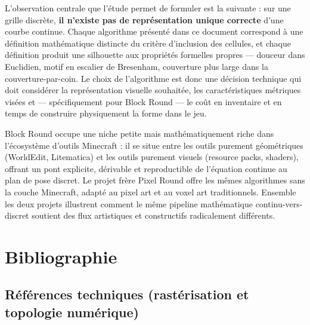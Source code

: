 \documentclass[12pt,a4paper]{scrartcl}
\newcommand{\acc}[1]{\textcolor{accent}{\textbf{#1}}}
\begin{document}
L'observation centrale que l'étude permet de formuler est la suivante : sur une grille discrète, \acc{il n'existe pas de représentation unique correcte} d'une courbe continue. Chaque algorithme présenté dans ce document correspond à une définition mathématique distincte du critère d'inclusion des cellules, et chaque définition produit une silhouette aux propriétés formelles propres --- douceur dans Euclidien, motif en escalier de Bresenham, couverture plus large dans la couverture-par-coin. Le choix de l'algorithme est donc une décision technique qui doit considérer la représentation visuelle souhaitée, les caractéristiques métriques visées et --- spécifiquement pour Block Round --- le coût en inventaire et en temps de construire physiquement la forme dans le jeu.

Block Round occupe une niche petite mais mathématiquement riche dans l'écosystème d'outils Minecraft : il se situe entre les outils purement géométriques (WorldEdit, Litematica) et les outils purement visuels (resource packs, shaders), offrant un pont explicite, dérivable et reproductible de l'équation continue au plan de pose discret. Le projet frère Pixel Round offre les mêmes algorithmes sans la couche Minecraft, adapté au pixel art et au voxel art traditionnels. Ensemble les deux projets illustrent comment le même pipeline mathématique continu-vers-discret soutient des flux artistiques et constructifs radicalement différents.

\section*{\color{accent}Bibliographie}
\label{sec:bib}

\subsection*{Références techniques (rastérisation et topologie numérique)}
\end{document}
